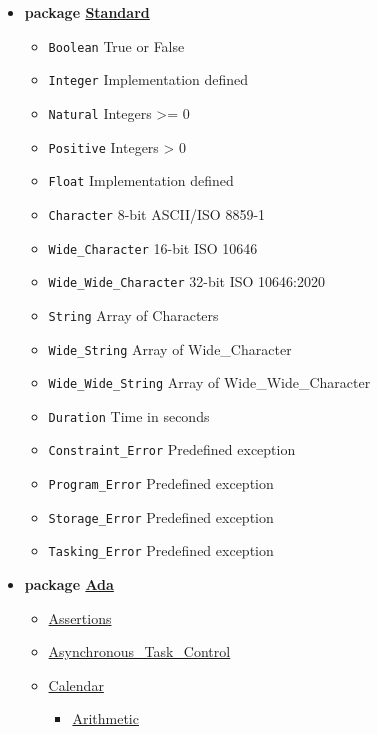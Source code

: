 \documentclass[english]{article}
\begin{document}
\begin{scriptsize}
\begin{multicols*}{5}
\begin{itemize}[leftmargin=0mm]
\item[] \textbf{package \href{http://www.ada-auth.org/standards/22rm/html/RM-A-1.html}{Standard}}
  \begin{itemize}[leftmargin=5mm]
  \item[] \texttt{Boolean} True or False
  \item[] \texttt{Integer} Implementation defined
  \item[] \texttt{Natural} Integers >= 0
  \item[] \texttt{Positive} Integers > 0
  \item[] \texttt{Float} Implementation defined
  \item[] \texttt{Character} 8-bit ASCII/ISO 8859-1
  \item[] \texttt{Wide\_Character} 16-bit ISO 10646
  \item[] \texttt{Wide\_Wide\_Character} 32-bit ISO 10646:2020
  \item[] \texttt{String} Array of Characters
  \item[] \texttt{Wide\_String} Array of Wide\_Character
  \item[] \texttt{Wide\_Wide\_String} Array of Wide\_Wide\_Character
  \item[] \texttt{Duration} Time in seconds
  \item[] \texttt{Constraint\_Error} Predefined exception
  \item[] \texttt{Program\_Error} Predefined exception
  \item[] \texttt{Storage\_Error} Predefined exception
  \item[] \texttt{Tasking\_Error} Predefined exception
  \end{itemize}
\item[] \textbf{package \href{http://www.ada-auth.org/standards/22rm/html/RM-A-2.html}{Ada}}
  \begin{itemize}[leftmargin=5mm]
  \item[] \href{http://www.ada-auth.org/standards/22rm/html/RM-11-4-2.html}{Assertions}
  \item[] \href{http://www.ada-auth.org/standards/22rm/html/RM-D-11.html}{Asynchronous\_Task\_Control}
  \item[] \href{http://www.ada-auth.org/standards/22rm/html/RM-9-6.html}{Calendar}
	\begin{itemize}[leftmargin=5mm]
	\item[] \href{http://www.ada-auth.org/standards/22rm/html/RM-9-6-1.html}{Arithmetic}

\end{itemize}
\end{itemize}
\end{itemize}
\end{multicols*}
\end{scriptsize}
\end{document}
